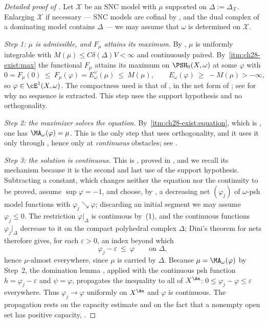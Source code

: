 \begin{proof}[Detailed proof of ]
Let \(\mathcal X\) be an SNC model with \(\mu\) supported on
\(\Delta:=\Delta_{\mathcal X}\).  Enlarging \(\mathcal X\) if necessary --- SNC
models are cofinal by , and the dual complex of a
dominating model contains \(\Delta\) --- we may assume that \(\omega\) is
determined on \(\mathcal X\).

\emph{Step 1: \(\mu\) is admissible, and \(F_\mu\) attains its maximum.}
By , \(\mu\) is uniformly integrable with
\(M(\mu)\leq C\delta(\Delta)V<\infty\) and continuously paired.  By
\,\cref{itm:ch28-exist:max} the
functional \(F_\mu\) attains its maximum on \(\PSH_0(X,\omega)\) at some
\(\varphi\) with
\[
 0=F_\mu(0)\ \leq\ F_\mu(\varphi)=E^\vee_\omega(\mu)\ \leq\ M(\mu),
 \qquad
 E_\omega(\varphi)\ \geq\ -M(\mu)>-\infty ,
\]
so \(\varphi\in\cE^1(X,\omega)\).  The compactness used is that of
, in the net form of
; see  for why no
sequence is extracted.  This step uses the support hypothesis and no
orthogonality.

\emph{Step 2: the maximizer solves the equation.}  By
\,\cref{itm:ch28-exist:equation}, which
is , one has
\(\MA_\omega(\varphi)=\mu\).  This is the only step that uses
orthogonality, and it uses it only through
, hence only at \emph{continuous}
obstacles; see .

\emph{Step 3: the solution is continuous.}  This is
, proved in
, and we recall its mechanism because it is the
second and last use of the support hypothesis.  Subtracting a constant,
which changes neither the equation nor the continuity to be proved, assume
\(\sup\varphi=-1\), and choose, by
, a decreasing net
\((\varphi_j)\) of \(\omega\)-psh model functions with
\(\varphi_j\searrow\varphi\); discarding an initial segment we may assume
\(\varphi_j\leq0\).  The restriction \(\varphi|_\Delta\) is continuous by
\,(1), and the continuous functions
\(\varphi_j|_\Delta\) decrease to it on the compact polyhedral complex
\(\Delta\); Dini's theorem for nets therefore gives, for each
\(\varepsilon>0\), an index beyond which
\[
 \varphi_j-\varepsilon\ \leq\ \varphi
 \qquad\text{on }\Delta ,
\]
hence \(\mu\)-almost everywhere, since \(\mu\) is carried by \(\Delta\).
Because \(\mu=\MA_\omega(\varphi)\) by Step~2, the domination lemma
, applied with the continuous psh
function \(h=\varphi_j-\varepsilon\) and \(\psi=\varphi\), propagates the
inequality to all of \(X^{\An}\):
\(0\leq\varphi_j-\varphi\leq\varepsilon\) everywhere.  Thus
\(\varphi_j\to\varphi\) uniformly on \(X^{\An}\) and \(\varphi\) is
continuous.  The propagation rests on the capacity estimate
 and on the fact that a nonempty open set
has positive capacity, .


\end{proof}
